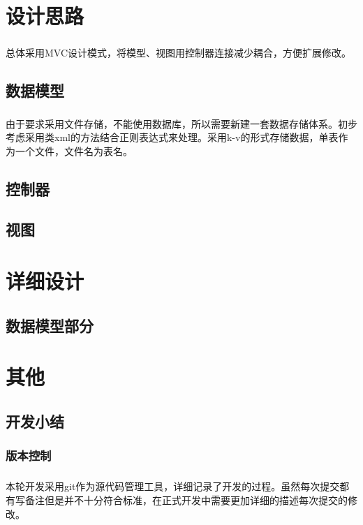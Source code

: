 \documentclass[notitlepage,cs4size,punct,oneside]{report}
\begin{document}
\begin{CJK}{UTF8}{hei}
\begin{description}
\end{description}


\chapter{设计思路}
\paragraph{}总体采用MVC设计模式，将模型、视图用控制器连接减少耦合，方便扩展修改。
\section{数据模型}
\paragraph{}由于要求采用文件存储，不能使用数据库，所以需要新建一套数据存储体系。初步考虑采用类xml的方法结合正则表达式来处理。采用k-v的形式存储数据，单表作为一个文件，文件名为表名。
\section{控制器}
\paragraph{}
\section{视图}
\paragraph{}

\chapter{详细设计}
\section{数据模型部分}

\chapter{其他}
\section{开发小结}
\subsection{版本控制}
\paragraph{}本轮开发采用git作为源代码管理工具，详细记录了开发的过程。虽然每次提交都有写备注但是并不十分符合标准，在正式开发中需要更加详细的描述每次提交的修改。

\pagebreak
\end{CJK}
\end{document}
